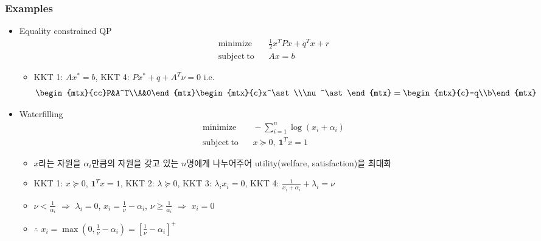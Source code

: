\subsubsection*{Examples}
\begin{itemize}
    \item Equality constrained QP
        $$ \begin{aligned}
            \mathrm{minimize}~~&~~\frac{1}{2}x^TPx + q^Tx + r \\
            \mathrm{subject~to}~~&~~Ax = b
        \end{aligned} $$
    \begin{itemize}
        \item KKT 1: $Ax^\ast = b$, KKT 4: $Px^\ast + q + A^T\nu = 0$ i.e.
            $$ \begin{mtx}{cc}P&A^T\\A&0\end{mtx}\begin{mtx}{c}x^\ast\\\nu^\ast\end{mtx}=\begin{mtx}{c}-q\\b\end{mtx} $$
    \end{itemize}
    \item Waterfilling
        $$ \begin{aligned}
            \mathrm{minimize}~~&~~-\sum_{i=1}^n \log(x_i + \alpha_i) \\
            \mathrm{subject~to}~~&~~x\succeq 0,~\mathbf{1}^Tx = 1
        \end{aligned} $$
    \begin{itemize}
        \item $x$라는 자원을 $\alpha_i$만큼의 자원을 갖고 있는 $n$명에게 나누어주어 utility(welfare, satisfaction)을 최대화
        \item KKT 1: $x\succeq 0$, $\mathbf{1}^Tx = 1$, KKT 2: $\lambda\succeq 0$, KKT 3: $\lambda_i x_i = 0$, KKT 4: $\frac{1}{x_i+\alpha_i}+\lambda_i=\nu$
        \item $\nu<\frac{1}{\alpha_i}$ $\Rightarrow$ $\lambda_i=0$, $x_i = \frac{1}{\nu}-\alpha_i$, $\nu\geq\frac{1}{\alpha_i}$ $\Rightarrow$ $x_i = 0$
        \item $\therefore$ $x_i = \max(0, \frac{1}{\nu}-\alpha_i) = \left[\frac{1}{\nu}-\alpha_i\right]^+$
    \end{itemize}
    \begin{figures}
    \end{figures}
\end{itemize}

